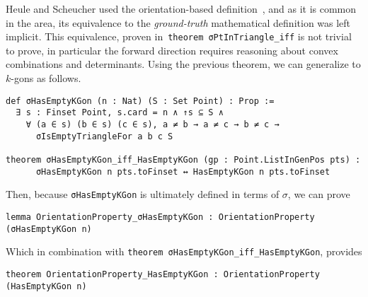 



Heule and Scheucher used the orientation-based definition~\cite{emptyHexagonNumber}, and as it is common in the area, its equivalence to the \emph{ground-truth} mathematical definition was left implicit. This equivalence, proven in~\lstinline|theorem σPtInTriangle_iff| is not trivial to prove, in particular the forward direction requires reasoning about convex combinations and determinants.
Using the previous theorem, we can generalize to $k$-gons as follows.
\begin{lstlisting}
def σHasEmptyKGon (n : Nat) (S : Set Point) : Prop :=
  ∃ s : Finset Point, s.card = n ∧ ↑s ⊆ S ∧
    ∀ (a ∈ s) (b ∈ s) (c ∈ s), a ≠ b → a ≠ c → b ≠ c →
      σIsEmptyTriangleFor a b c S

theorem σHasEmptyKGon_iff_HasEmptyKGon (gp : Point.ListInGenPos pts) :
      σHasEmptyKGon n pts.toFinset ↔ HasEmptyKGon n pts.toFinset
\end{lstlisting}

Then, because \lstinline|σHasEmptyKGon| is ultimately defined in terms of $\sigma$, we can prove
\begin{lstlisting}
lemma OrientationProperty_σHasEmptyKGon : OrientationProperty (σHasEmptyKGon n)
\end{lstlisting}
Which in combination with \lstinline|theorem σHasEmptyKGon_iff_HasEmptyKGon|, provides
\begin{lstlisting}
theorem OrientationProperty_HasEmptyKGon : OrientationProperty (HasEmptyKGon n)
\end{lstlisting}

